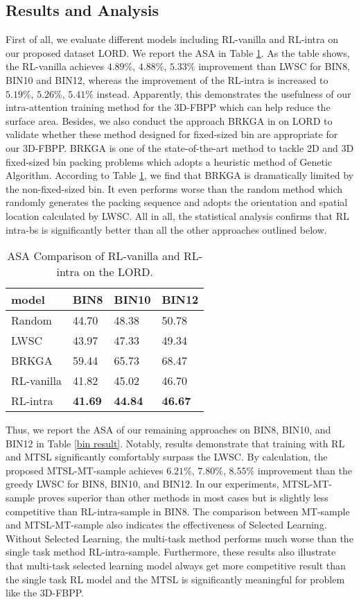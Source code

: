 \subsection{Results and Analysis}
\label{sec:eval}
First of all, we evaluate different models including RL-vanilla and RL-intra on our proposed dataset LORD. We report the ASA in Table \ref{rl-result}. As the table shows, the RL-vanilla achieves $4.89\%$, $4.88\%$, $5.33\%$ improvement than LWSC for BIN8, BIN10 and BIN12, whereas the improvement of the RL-intra is increased to $5.19\%$, $5.26\%$, $5.41\%$ instead. Apparently, this demonstrates the usefulness of our intra-attention training method for the 3D-FBPP which can help reduce the surface area. 
Besides, we also conduct the approach BRKGA in \cite{gonccalves2013biased} on LORD to validate whether these method designed for fixed-sized bin are appropriate for our 3D-FBPP. BRKGA is one of the state-of-the-art method to tackle 2D and 3D fixed-sized bin packing problems which adopts a heuristic method of Genetic Algorithm. According to Table \ref{rl-result}, we find that BRKGA is dramatically limited by the non-fixed-sized bin. It even performs worse than the random method which randomly generates the packing sequence and adopts the orientation and spatial location calculated by LWSC. All in all, the statistical analysis confirms that RL intra-bs is significantly better than all the other approaches outlined below.
\begin{table}[!htb]
	\vspace{-10pt}
	\centering
	\begin{tabular}{l|l l l}
		\hline
		model &   BIN8 & BIN10 & BIN12 \\ \hline
		Random &  44.70 & 48.38 & 50.78 \\ 
		LWSC & 43.97 & 47.33 & 49.34 \\
		BRKGA  &59.44 & 65.73 & 68.47 \\
		RL-vanilla & 41.82 & 45.02 & 46.70 \\ 
		RL-intra & \textbf{41.69} & \textbf{44.84} & \textbf{46.67} \\ \hline
	\end{tabular}
    \caption{ASA Comparison of RL-vanilla and RL-intra on the LORD.}
    \label{rl-result}
	\vspace{-10pt}
\end{table}
Thus, we report the ASA of our remaining approaches on BIN8, BIN10, and BIN12 in Table \ref{bin result}. Notably, results demonstrate that training with RL and MTSL significantly comfortably surpass the LWSC. By calculation, the proposed MTSL-MT-sample achieves $6.21\%$, $7.80\%$, $8.55\%$ improvement than the greedy LWSC for BIN8, BIN10, and BIN12. In our experiments, MTSL-MT-sample proves superior than other methods in most cases but is slightly less competitive than RL-intra-sample in BIN8. The comparison between MT-sample and MTSL-MT-sample also indicates the effectiveness of Selected Learning. Without Selected Learning, the multi-task method performs much worse than the single task method RL-intra-sample. Furthermore, these results also illustrate that multi-task selected learning model always get more competitive result than the single task RL model and the MTSL is significantly meaningful for problem like the 3D-FBPP.
